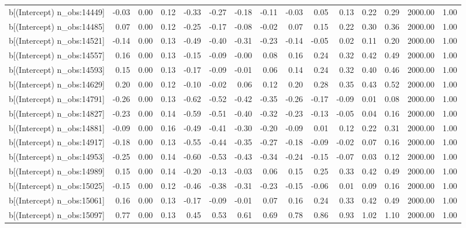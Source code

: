 \begin{table}[ht]
\begin{tabular}{rrrrrrrrrrrrrrr}
  b[(Intercept) n\_obs:14449] & -0.03 & 0.00 & 0.12 & -0.33 & -0.27 & -0.18 & -0.11 & -0.03 & 0.05 & 0.13 & 0.22 & 0.29 & 2000.00 & 1.00 \\ 
  b[(Intercept) n\_obs:14485] & 0.07 & 0.00 & 0.12 & -0.25 & -0.17 & -0.08 & -0.02 & 0.07 & 0.15 & 0.22 & 0.30 & 0.36 & 2000.00 & 1.00 \\ 
  b[(Intercept) n\_obs:14521] & -0.14 & 0.00 & 0.13 & -0.49 & -0.40 & -0.31 & -0.23 & -0.14 & -0.05 & 0.02 & 0.11 & 0.20 & 2000.00 & 1.00 \\ 
  b[(Intercept) n\_obs:14557] & 0.16 & 0.00 & 0.13 & -0.15 & -0.09 & -0.00 & 0.08 & 0.16 & 0.24 & 0.32 & 0.42 & 0.49 & 2000.00 & 1.00 \\ 
  b[(Intercept) n\_obs:14593] & 0.15 & 0.00 & 0.13 & -0.17 & -0.09 & -0.01 & 0.06 & 0.14 & 0.24 & 0.32 & 0.40 & 0.46 & 2000.00 & 1.00 \\ 
  b[(Intercept) n\_obs:14629] & 0.20 & 0.00 & 0.12 & -0.10 & -0.02 & 0.06 & 0.12 & 0.20 & 0.28 & 0.35 & 0.43 & 0.52 & 2000.00 & 1.00 \\ 
  b[(Intercept) n\_obs:14791] & -0.26 & 0.00 & 0.13 & -0.62 & -0.52 & -0.42 & -0.35 & -0.26 & -0.17 & -0.09 & 0.01 & 0.08 & 2000.00 & 1.00 \\ 
  b[(Intercept) n\_obs:14827] & -0.23 & 0.00 & 0.14 & -0.59 & -0.51 & -0.40 & -0.32 & -0.23 & -0.13 & -0.05 & 0.04 & 0.16 & 2000.00 & 1.00 \\ 
  b[(Intercept) n\_obs:14881] & -0.09 & 0.00 & 0.16 & -0.49 & -0.41 & -0.30 & -0.20 & -0.09 & 0.01 & 0.12 & 0.22 & 0.31 & 2000.00 & 1.00 \\ 
  b[(Intercept) n\_obs:14917] & -0.18 & 0.00 & 0.13 & -0.55 & -0.44 & -0.35 & -0.27 & -0.18 & -0.09 & -0.02 & 0.07 & 0.16 & 2000.00 & 1.00 \\ 
  b[(Intercept) n\_obs:14953] & -0.25 & 0.00 & 0.14 & -0.60 & -0.53 & -0.43 & -0.34 & -0.24 & -0.15 & -0.07 & 0.03 & 0.12 & 2000.00 & 1.00 \\ 
  b[(Intercept) n\_obs:14989] & 0.15 & 0.00 & 0.14 & -0.20 & -0.13 & -0.03 & 0.06 & 0.15 & 0.25 & 0.33 & 0.42 & 0.49 & 2000.00 & 1.00 \\ 
  b[(Intercept) n\_obs:15025] & -0.15 & 0.00 & 0.12 & -0.46 & -0.38 & -0.31 & -0.23 & -0.15 & -0.06 & 0.01 & 0.09 & 0.16 & 2000.00 & 1.00 \\ 
  b[(Intercept) n\_obs:15061] & 0.16 & 0.00 & 0.13 & -0.17 & -0.09 & -0.01 & 0.07 & 0.16 & 0.24 & 0.33 & 0.42 & 0.49 & 2000.00 & 1.00 \\ 
  b[(Intercept) n\_obs:15097] & 0.77 & 0.00 & 0.13 & 0.45 & 0.53 & 0.61 & 0.69 & 0.78 & 0.86 & 0.93 & 1.02 & 1.10 & 2000.00 & 1.00 \\ 

\end{tabular}
\end{table}
